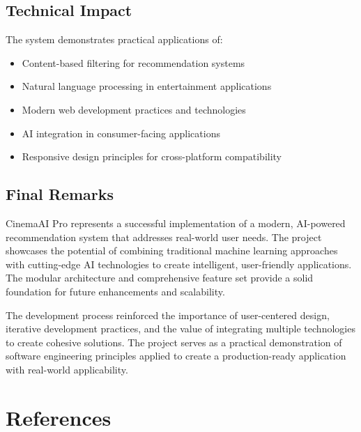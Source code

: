 \documentclass[12pt,a4paper]{article}
\begin{document}
\subsection{Technical Impact}
The system demonstrates practical applications of:
\begin{itemize}
    \item Content-based filtering for recommendation systems
    \item Natural language processing in entertainment applications
    \item Modern web development practices and technologies
    \item AI integration in consumer-facing applications
    \item Responsive design principles for cross-platform compatibility
\end{itemize}

\subsection{Final Remarks}
CinemaAI Pro represents a successful implementation of a modern, AI-powered recommendation system that addresses real-world user needs. The project showcases the potential of combining traditional machine learning approaches with cutting-edge AI technologies to create intelligent, user-friendly applications. The modular architecture and comprehensive feature set provide a solid foundation for future enhancements and scalability.

The development process reinforced the importance of user-centered design, iterative development practices, and the value of integrating multiple technologies to create cohesive solutions. The project serves as a practical demonstration of software engineering principles applied to create a production-ready application with real-world applicability.

\section{References}
\end{document}
